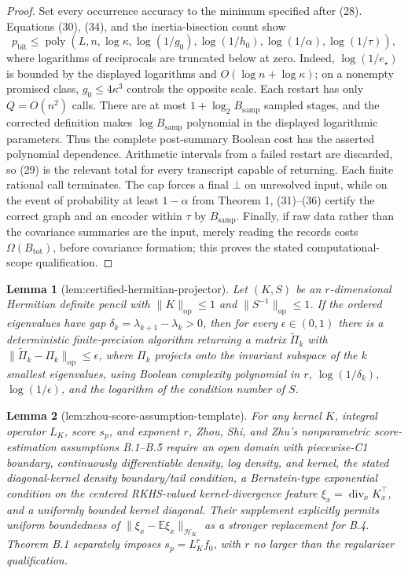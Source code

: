 \documentclass{article}
\newtheorem{lemma}{Lemma}
\begin{document}
\begin{proof}
Set every occurrence accuracy to the minimum specified after (28).  Equations (30), (34), and the inertia-bisection count show
\[
 p_{\mathrm{bit}}\le
 \operatorname{poly}\!\left(L,n,\log\kappa,
 \log(1/g_0),\log(1/h_0),\log(1/\alpha),\log(1/\tau)\right),
\]
where logarithms of reciprocals are truncated below at zero.  Indeed, \(\log(1/e_{\star})\) is bounded by the displayed logarithms and \(O(\log n+\log\kappa)\); on a nonempty promised class, \(g_0\le4\kappa^3\) controls the opposite scale.  Each restart has only \(Q=O(n^2)\) calls.  There are at most \(1+\log_2 B_{\mathrm{samp}}\) sampled stages, and the corrected definition makes \(\log B_{\mathrm{samp}}\) polynomial in the displayed logarithmic parameters.  Thus the complete post-summary Boolean cost has the asserted polynomial dependence.  Arithmetic intervals from a failed restart are discarded, so (29) is the relevant total for every transcript capable of returning.  Each finite rational call terminates.  The cap forces a final \(\bot\) on unresolved input, while on the event of probability at least \(1-\alpha\) from Theorem 1, (31)--(36) certify the correct graph and an encoder within \(\tau\) by \(B_{\mathrm{samp}}\).  Finally, if raw data rather than the covariance summaries are the input, merely reading the records costs \(\Omega(B_{\mathrm{tot}})\), before covariance formation; this proves the stated computational-scope qualification.
\end{proof}

\begin{lemma}[lem:certified-hermitian-projector]\label{lem:certified-hermitian-projector}
Let \((K,S)\) be an \(r\)-dimensional Hermitian definite pencil with \(\|K\|_{\mathrm{op}}\le1\) and \(\|S^{-1}\|_{\mathrm{op}}\le1\). If the ordered eigenvalues have gap \(\delta_k=\lambda_{k+1}-\lambda_k>0\), then for every \(\epsilon\in(0,1)\) there is a deterministic finite-precision algorithm returning a matrix \(\widetilde\Pi_k\) with \(\|\widetilde\Pi_k-\Pi_k\|_{\mathrm{op}}\le\epsilon\), where \(\Pi_k\) projects onto the invariant subspace of the \(k\) smallest eigenvalues, using Boolean complexity polynomial in \(r\), \(\log(1/\delta_k)\), \(\log(1/\epsilon)\), and the logarithm of the condition number of \(S\).
\end{lemma}

\begin{lemma}[lem:zhou-score-assumption-template]\label{lem:zhou-score-assumption-template}
For any kernel \(K\), integral operator \(L_K\), score \(s_p\), and exponent \(r\), Zhou, Shi, and Zhu's nonparametric score-estimation assumptions B.1--B.5 require an open domain with piecewise-C1 boundary, continuously differentiable density, log density, and kernel, the stated diagonal-kernel density boundary/tail condition, a Bernstein-type exponential condition on the centered RKHS-valued kernel-divergence feature \(\xi_x=\operatorname{div}_xK_x^\top\), and a uniformly bounded kernel diagonal. Their supplement explicitly permits uniform boundedness of \(\|\xi_x-\mathbb E\xi_x\|_{\mathcal H_K}\) as a stronger replacement for B.4. Theorem B.1 separately imposes \(s_p=L_K^rf_0\), with \(r\) no larger than the regularizer qualification.
\end{lemma}
\end{document}
